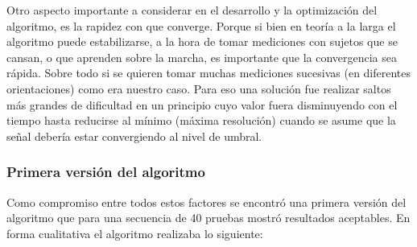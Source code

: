 \documentclass{article}
\numberwithin{figure}{section}
\begin{document}
    Otro aspecto importante a considerar en el desarrollo y la optimización del algoritmo, es la rapidez con que converge. Porque si bien en teoría a la larga el algoritmo puede estabilizarse, a la hora de tomar mediciones con sujetos que se cansan, o que aprenden sobre la marcha, es importante que la convergencia sea rápida. Sobre todo si se quieren tomar muchas mediciones sucesivas (en diferentes orientaciones) como era nuestro caso. Para eso una solución fue realizar saltos más grandes de dificultad en un principio cuyo valor fuera disminuyendo con el tiempo hasta reducirse al mínimo (máxima resolución) cuando se asume que la señal debería estar convergiendo al nivel de umbral. 
    
    \subsubsection{Primera versión del algoritmo} \label{staircase1}
    
    Como compromiso entre todos estos factores se encontró una primera versión del algoritmo que para una secuencia de 40 pruebas mostró resultados aceptables. En forma cualitativa el algoritmo realizaba lo siguiente:
    
\end{document}
